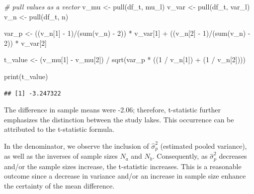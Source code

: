 \documentclass[
]{book}
\newenvironment{Shaded}{\begin{snugshade}}{\end{snugshade}}
\newcommand{\CommentTok}[1]{\textcolor[rgb]{0.56,0.35,0.01}{\textit{#1}}}
\newcommand{\DecValTok}[1]{\textcolor[rgb]{0.00,0.00,0.81}{#1}}
\newcommand{\FunctionTok}[1]{\textcolor[rgb]{0.00,0.00,0.00}{#1}}
\newcommand{\NormalTok}[1]{#1}
\newcommand{\OtherTok}[1]{\textcolor[rgb]{0.56,0.35,0.01}{#1}}
\newcommand{\SpecialCharTok}[1]{\textcolor[rgb]{0.00,0.00,0.00}{#1}}
\begin{document}
\begin{Shaded}
\begin{Highlighting}[]
\CommentTok{\# pull values as a vector}
\NormalTok{v\_mu }\OtherTok{\textless{}{-}} \FunctionTok{pull}\NormalTok{(df\_t, mu\_l)}
\NormalTok{v\_var }\OtherTok{\textless{}{-}} \FunctionTok{pull}\NormalTok{(df\_t, var\_l)}
\NormalTok{v\_n }\OtherTok{\textless{}{-}} \FunctionTok{pull}\NormalTok{(df\_t, n)}

\NormalTok{var\_p }\OtherTok{\textless{}{-}}\NormalTok{ ((v\_n[}\DecValTok{1}\NormalTok{] }\SpecialCharTok{{-}} \DecValTok{1}\NormalTok{)}\SpecialCharTok{/}\NormalTok{(}\FunctionTok{sum}\NormalTok{(v\_n) }\SpecialCharTok{{-}} \DecValTok{2}\NormalTok{)) }\SpecialCharTok{*}\NormalTok{ v\_var[}\DecValTok{1}\NormalTok{] }\SpecialCharTok{+}
\NormalTok{  ((v\_n[}\DecValTok{2}\NormalTok{] }\SpecialCharTok{{-}} \DecValTok{1}\NormalTok{)}\SpecialCharTok{/}\NormalTok{(}\FunctionTok{sum}\NormalTok{(v\_n) }\SpecialCharTok{{-}} \DecValTok{2}\NormalTok{)) }\SpecialCharTok{*}\NormalTok{ v\_var[}\DecValTok{2}\NormalTok{]}

\NormalTok{t\_value }\OtherTok{\textless{}{-}}\NormalTok{ (v\_mu[}\DecValTok{1}\NormalTok{] }\SpecialCharTok{{-}}\NormalTok{ v\_mu[}\DecValTok{2}\NormalTok{]) }\SpecialCharTok{/} \FunctionTok{sqrt}\NormalTok{(var\_p }\SpecialCharTok{*}\NormalTok{ ((}\DecValTok{1} \SpecialCharTok{/}\NormalTok{ v\_n[}\DecValTok{1}\NormalTok{]) }\SpecialCharTok{+}\NormalTok{ (}\DecValTok{1} \SpecialCharTok{/}\NormalTok{ v\_n[}\DecValTok{2}\NormalTok{])))}

\FunctionTok{print}\NormalTok{(t\_value)}
\end{Highlighting}
\end{Shaded}

\begin{verbatim}
## [1] -3.247322
\end{verbatim}

The difference in sample means were -2.06; therefore, t-statistic further emphasizes the distinction between the study lakes. This occurrence can be attributed to the t-statistic formula.

In the denominator, we observe the inclusion of \(\hat{\sigma}^2_p\) (estimated pooled variance), as well as the inverses of sample sizes \(N_a\) and \(N_b\). Consequently, as \(\hat{\sigma}^2_p\) decreases and/or the sample sizes increase, the t-statistic increases. This is a reasonable outcome since a decrease in variance and/or an increase in sample size enhance the certainty of the mean difference.
\end{document}
